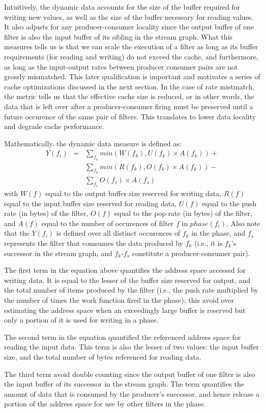 Intuitively, the dynamic data accounts for the size of the buffer
required for writing new values, as well as the size of the buffer
necessary for reading values. It also adjusts for any
producer-consumer locality since the output buffer of one filter is
also the input buffer of its sibling in the stream graph. What this
measures tells us is that we can scale the execution of a filter as
long as its buffer requirements (for reading and writing) do not
exceed the cache, and furthermore, as long as the input-output rates
between producer consumer pairs are not grossly mismatched. This later
qualification is important and motivates a series of cache
optimizations discussed in the next section. In the case of rate
mistmatch, the metric tells us that the effective cache size is
reduced, or in other words, the data that is left over after a
producer-consumer firing must be preserved until a future occurence of
the same pair of filters. This translates to lower data locality and
degrade cache performance.

Mathematically. the dynamic data measure is defined as:
\begin{eqnarray}
  \nonumber
  Y(f_i) &=&\sum_{f_k} min(W(f_k), U(f_k) \times A(f_k)) + \\
  \nonumber
	   &&\sum_{f_k} min(R(f_k), O(f_k) \times A(f_k)) - \\
  \nonumber
         &&\sum_{f_s} O(f_s) \times A(f_s)
\end{eqnarray}
with $W(f)$ equal to the output buffer size reserved for writing data, $R(f)$
equal to the input buffer size reserved for reading data, $U(f)$ equal to the
push rate (in bytes) of the filter, $O(f)$ equal to the pop rate (in
bytes) of the filter, and $A(f)$ equal to the number of occurences of
filter $f$ in $phase(f_i)$. Also note that the $Y(f_i)$ is defined
over all distinct occurences of $f_k$ in the phase, and $f_s$
represents the filter that comsumes the data produced by $f_k$ (i.e.,
it is $f_k$'s successor in the stream graph, and $f_k$-$f_s$
constitute a producer-consumer pair).

The first term in the equation above quantifies the address space
accessed for writing data. It is  equal to the lesser of the buffer size
reserved for output, and the total number of items produced by
the filter (i.e., the push rate multiplied by the number of times the
work function fired in the phase); this avoid over estimating the
address space when an exceedingly large buffer is reserved but only a
portion of it is used for writing in a phase.

The second term in the equation quantified the referenced address space 
for reading the input data. This term is also the lesser of two
values: the input buffer size, and the total number of bytes referenced for
reading data.

The third term avoid double counting since the output buffer of one
filter is also the input buffer of its successor in the stream
graph. The term quantifies the amount of data that is consumed by the
producer's successor, and hence release a portion of the address space
for use by other filters in the phase.

